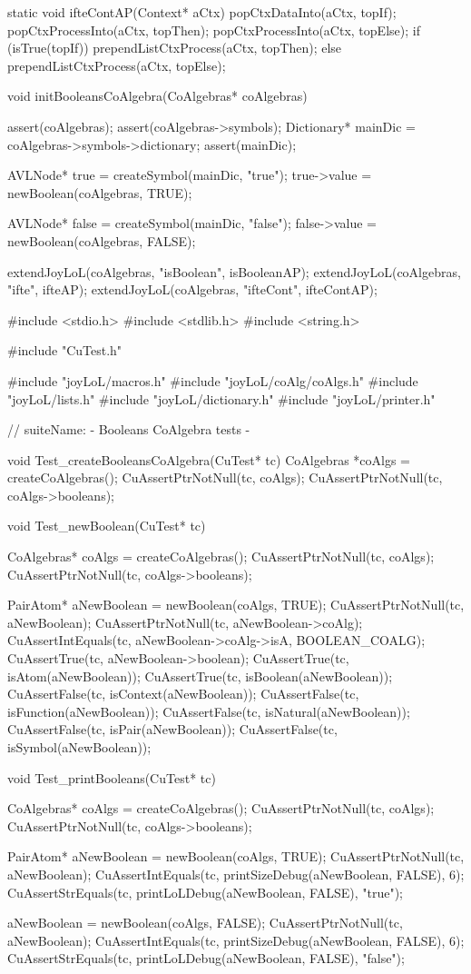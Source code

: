 static void ifteContAP(Context* aCtx) {
  popCtxDataInto(aCtx, topIf);
  popCtxProcessInto(aCtx, topThen);
  popCtxProcessInto(aCtx, topElse);
  if (isTrue(topIf)) {
    prependListCtxProcess(aCtx, topThen);
  } else {
    prependListCtxProcess(aCtx, topElse);
  }
}

void initBooleansCoAlgebra(CoAlgebras* coAlgebras) {
  assert(coAlgebras);
  assert(coAlgebras->symbols);
  Dictionary* mainDic = coAlgebras->symbols->dictionary;
  assert(mainDic);

  AVLNode* true  = createSymbol(mainDic, "true");
  true->value    = newBoolean(coAlgebras, TRUE);

  AVLNode* false = createSymbol(mainDic, "false");
  false->value   = newBoolean(coAlgebras, FALSE);

  extendJoyLoL(coAlgebras, "isBoolean", isBooleanAP);
  extendJoyLoL(coAlgebras, "ifte",      ifteAP);
  extendJoyLoL(coAlgebras, "ifteCont",  ifteContAP);
}

\stoptyping

\starttyping
#include <stdio.h>
#include <stdlib.h>
#include <string.h>

#include "CuTest.h"

#include "joyLoL/macros.h"
#include "joyLoL/coAlg/coAlgs.h"
#include "joyLoL/lists.h"
#include "joyLoL/dictionary.h"
#include "joyLoL/printer.h"

// suiteName: - Booleans CoAlgebra tests -

void Test_createBooleansCoAlgebra(CuTest* tc) {
  CoAlgebras *coAlgs = createCoAlgebras();
  CuAssertPtrNotNull(tc, coAlgs);
  CuAssertPtrNotNull(tc, coAlgs->booleans);
}

void Test_newBoolean(CuTest* tc) {
  CoAlgebras* coAlgs = createCoAlgebras();
  CuAssertPtrNotNull(tc, coAlgs);
  CuAssertPtrNotNull(tc, coAlgs->booleans);

  PairAtom* aNewBoolean = newBoolean(coAlgs, TRUE);
  CuAssertPtrNotNull(tc, aNewBoolean);
  CuAssertPtrNotNull(tc, aNewBoolean->coAlg);
  CuAssertIntEquals(tc, aNewBoolean->coAlg->isA, BOOLEAN_COALG);
  CuAssertTrue(tc, aNewBoolean->boolean);
  CuAssertTrue(tc, isAtom(aNewBoolean));
  CuAssertTrue(tc, isBoolean(aNewBoolean));
  CuAssertFalse(tc, isContext(aNewBoolean));
  CuAssertFalse(tc, isFunction(aNewBoolean));
  CuAssertFalse(tc, isNatural(aNewBoolean));
  CuAssertFalse(tc, isPair(aNewBoolean));
  CuAssertFalse(tc, isSymbol(aNewBoolean));
}

void Test_printBooleans(CuTest* tc) {
  CoAlgebras* coAlgs = createCoAlgebras();
  CuAssertPtrNotNull(tc, coAlgs);
  CuAssertPtrNotNull(tc, coAlgs->booleans);

  PairAtom* aNewBoolean = newBoolean(coAlgs, TRUE);
  CuAssertPtrNotNull(tc, aNewBoolean);
  CuAssertIntEquals(tc, printSizeDebug(aNewBoolean, FALSE), 6);
  CuAssertStrEquals(tc, printLoLDebug(aNewBoolean, FALSE), "true");

  aNewBoolean = newBoolean(coAlgs, FALSE);
  CuAssertPtrNotNull(tc, aNewBoolean);
  CuAssertIntEquals(tc, printSizeDebug(aNewBoolean, FALSE), 6);
  CuAssertStrEquals(tc, printLoLDebug(aNewBoolean, FALSE), "false");
}

